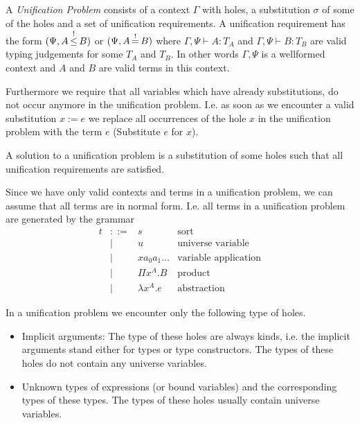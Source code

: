 \begin{definition} A \emph{Unification Problem} consists of a context $\Gamma$
with holes, a substitution $\sigma$ of some of the holes and a set of
unification requirements. A unification requirement has the form $(\Psi, A
{\,\stackrel{!}{\le}\,} B)$ or $(\Psi, A {\,\stackrel{!}{=}\,} B)$ where $\Gamma,\Psi \vdash A: T_A$ and
$\Gamma,\Psi \vdash B: T_B$ are valid typing judgements for some $T_A$ and
$T_B$. In other words $\Gamma,\Psi$ is a wellformed context and $A$ and $B$ are
valid terms in this context.

Furthermore we require that all variables which have already substitutions, do
not occur anymore in the unification problem. I.e. as soon as we encounter a
valid substitution $x:=e$ we replace all occurrences of the hole $x$ in the
unification problem with the term $e$ (Substitute $e$ for $x$).

A solution to a unification problem is a substitution of some holes such that
all unification requirements are satisfied.
\end{definition}


Since we have only valid contexts and terms in a unification problem, we can
assume that all terms are in normal form. I.e. all terms in a unification
problem are generated by the grammar
$$
\begin{array}{lllll}
    t &::=&  s & \text{sort}
    \\
    &\mid&  u & \text{universe variable}
    \\
    &\mid& x a_0 a_1 \ldots & \text{variable application}
    \\
    &\mid& \Pi x^A. B       & \text{product}
    \\
    &\mid& \lambda x^A. e   & \text{abstraction}
\end{array}
$$


In a unification problem we encounter only the following type of holes.
\begin{itemize}

\item Implicit arguments: The type of these holes are always kinds, i.e. the
implicit arguments stand either for types or type constructors. The types of
these holes do not contain any universe variables.

\item Unknown types of expressions (or bound variables) and the corresponding
types of these types. The types of these holes usually contain universe
variables.

\end{itemize}


